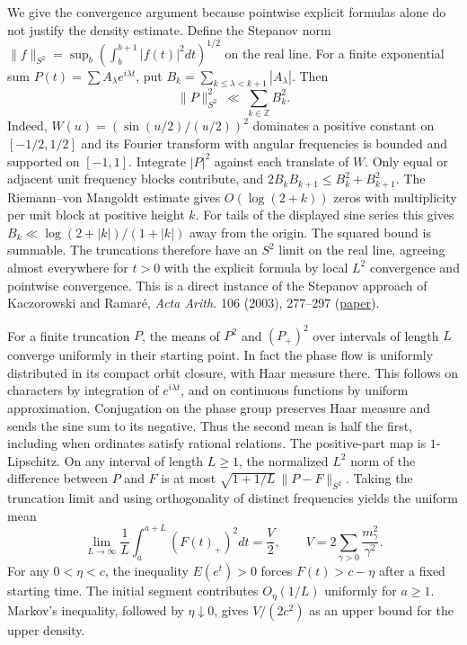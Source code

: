 We give the convergence argument because pointwise explicit formulas alone
do not justify the density estimate. Define the Stepanov norm
$\|f\|_{S^2}=\sup_b(\int_b^{b+1}|f(t)|^2dt)^{1/2}$ on the real line.
For a finite exponential sum $P(t)=\sum A_\lambda e^{i\lambda t}$, put
$B_k=\sum_{k\le\lambda<k+1}|A_\lambda|$. Then
\[
                \|P\|_{S^2}^2\ \ll\ \sum_{k\in\mathbb Z} B_k^2 .
\]
Indeed, $W(u)=(\sin(u/2)/(u/2))^2$ dominates a positive constant on
$[-1/2,1/2]$ and its Fourier transform with angular frequencies is bounded
and supported on $[-1,1]$. Integrate $|P|^2$ against each translate of $W$.
Only equal or adjacent unit frequency blocks contribute, and
$2B_kB_{k+1}\le B_k^2+B_{k+1}^2$.
The Riemann--von Mangoldt estimate gives $O(\log(2+k))$ zeros with
multiplicity per unit block at positive height $k$.
For tails of the displayed sine series this gives
$B_k\ll\log(2+|k|)/(1+|k|)$ away from the origin.
The squared bound is summable. The truncations therefore have an $S^2$
limit on the real line, agreeing almost everywhere for $t>0$ with the
explicit formula by local $L^2$ convergence and pointwise convergence.
This is a direct instance of the Stepanov approach of
Kaczorowski and Ramar\'e, \emph{Acta Arith.} 106 (2003), 277--297
(\href{https://doi.org/10.4064/aa106-3-6}{paper}).

For a finite truncation $P$, the means of $P^2$ and $(P_+)^2$ over
intervals of length $L$ converge uniformly in their starting point.
In fact the phase flow is uniformly distributed in its compact orbit closure,
with Haar measure there. This follows on characters by integration of
$e^{i\lambda t}$, and on continuous functions by uniform approximation.
Conjugation on the phase group preserves Haar measure and sends the sine
sum to its negative. Thus the second mean is half the first, including
when ordinates satisfy rational relations.
The positive-part map is $1$-Lipschitz. On any interval of length $L\ge1$,
the normalized $L^2$ norm of the difference between $P$ and $F$ is at most
$\sqrt{1+1/L}\,\|P-F\|_{S^2}$. Taking the truncation limit and using
orthogonality of distinct frequencies yields the uniform mean
\[
          \lim_{L\to\infty}\frac1L\int_a^{a+L} (F(t)_+)^2dt
          =\frac V2,\qquad V=2\sum_{\gamma>0}\frac{m_\gamma^2}{\gamma^2}.
\]
For any $0<\eta<c$, the inequality $E(e^t)>0$ forces
$F(t)>c-\eta$ after a fixed starting time. The initial segment contributes
$O_\eta(1/L)$ uniformly for $a\ge1$.
Markov's inequality, followed by $\eta\downarrow0$, gives $V/(2c^2)$
as an upper bound for the upper density.


